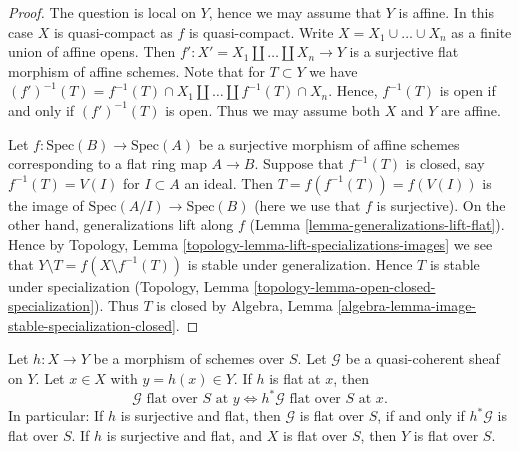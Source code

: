 \begin{proof}
The question is local on $Y$, hence we may assume that $Y$ is affine.
In this case $X$ is quasi-compact as $f$ is quasi-compact.
Write $X = X_1 \cup \ldots \cup X_n$ as a finite union of affine opens.
Then $f' : X' = X_1 \coprod \ldots \coprod X_n \to Y$ is a surjective
flat morphism of affine schemes. Note that for $T \subset Y$ we have
$(f')^{-1}(T) = f^{-1}(T) \cap X_1 \coprod \ldots \coprod f^{-1}(T) \cap X_n$.
Hence, $f^{-1}(T)$ is open if and only if $(f')^{-1}(T)$ is open.
Thus we may assume both $X$ and $Y$ are affine.

\medskip\noindent
Let $f : \text{Spec}(B) \to \text{Spec}(A)$ be a surjective
morphism of affine schemes corresponding to a flat ring map $A \to B$.
Suppose that $f^{-1}(T)$ is closed, say $f^{-1}(T) = V(I)$ for $I \subset A$
an ideal. Then $T = f(f^{-1}(T)) = f(V(I))$ is the image of
$\text{Spec}(A/I) \to \text{Spec}(B)$ (here we use that $f$
is surjective). On the other hand, generalizations lift along $f$
(Lemma \ref{lemma-generalizations-lift-flat}).
Hence by Topology, Lemma \ref{topology-lemma-lift-specializations-images}
we see that $Y \setminus T = f(X \setminus f^{-1}(T))$ is stable under
generalization. Hence $T$ is stable under specialization
(Topology, Lemma \ref{topology-lemma-open-closed-specialization}).
Thus $T$ is closed by
Algebra, Lemma \ref{algebra-lemma-image-stable-specialization-closed}.
\end{proof}

\begin{lemma}
\label{lemma-flat-permanence}
Let $h : X \to Y$ be a morphism of schemes over $S$.
Let $\mathcal{G}$ be a quasi-coherent sheaf on $Y$.
Let $x \in X$ with $y = h(x) \in Y$. If $h$ is flat at $x$, then
$$
\mathcal{G}\text{ flat over }S\text{ at }y
\Leftrightarrow
h^*\mathcal{G}\text{ flat over }S\text{ at }x.
$$
In particular: If $h$ is surjective and flat, then
$\mathcal{G}$ is flat over $S$, if and only if
$h^*\mathcal{G}$ is flat over $S$. If $h$ is surjective and
flat, and $X$ is flat over $S$, then $Y$ is flat over $S$.
\end{lemma}

